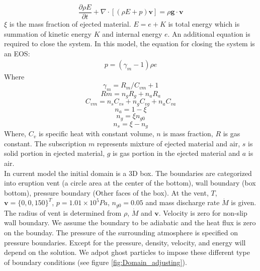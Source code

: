 \documentclass[conference,compsoc]{IEEEtran}
\begin{document}
\begin{equation}
\dfrac{\partial \rho E}{\partial t} + \nabla \cdot [(\rho E + p )\textbf{v}] = \rho \textbf{g} \cdot\textbf{v} \label{eq:gov-cs-e}
\end{equation}
$\xi$ is the mass fraction of ejected material.
$E = e + K $ is total energy which is summation of kinetic energy $K$ and internal energy $e$.
An additional equation is required to close the system. In this model, the equation for closing the system is an EOS:
\begin{align}
p = (\gamma_m - 1)\rho e \label{eq:EOS}
\end{align}
Where 
\begin{equation}
\gamma_m = R_m/C_{vm} + 1 \label{eq:gov-gm}
\end{equation}
\begin{equation}
Rm = n_gR_g + n_aR_a  \label{eq:gov-Rm}
\end{equation}
\begin{equation}
C_{vm} = n_s C_{vs} + n_g C_{vg} + n_a C_{va} \label{eq:gov-Cvm}
\end{equation}
\begin{equation}
n_a = 1 - \xi \label{eq:gov-na}
\end{equation}
\begin{equation}
n_g = \xi n_{g0} \label{eq:gov-ng}
\end{equation}
\begin{equation}
n_s = \xi - n_g \label{eq:gov-ns}
\end{equation}
Where, $C_v$ is specific heat with constant volume, $n$ is mass fraction, $R$ is gas constant. The subscription $m$ represents mixture of ejected material and air, $s$ is solid portion in ejected material, $g$ is gas portion in the ejected material and $a$ is air.\\
In current model the initial domain is a 3D box. The boundaries are categorized into eruption vent (a circle area at the center of the bottom), wall boundary (box bottom), pressure boundary (Other faces of the box).
At the vent, $T$, $\textbf{v}=\{0,0,150\}^T$, $p=1.01\times10^5 Pa$, $n_{g0}=0.05$ and mass discharge rate $\dot M$ is given. The radius of vent is determined from $\rho$, $\dot M$ and $\textbf{v}$.
Velocity is zero for non-slip wall boundary. We assume the boundary to be adiabatic and the heat flux is zero on the bounday. The pressure of the surrounding atmosphere is specified on pressure boundaries. Except for the pressure, density, velocity, and energy will depend on the solution. We adpot ghost particles to impose these different type of boundary conditions (see figure \ref{fig:Domain_adjusting}). 
\end{document}
